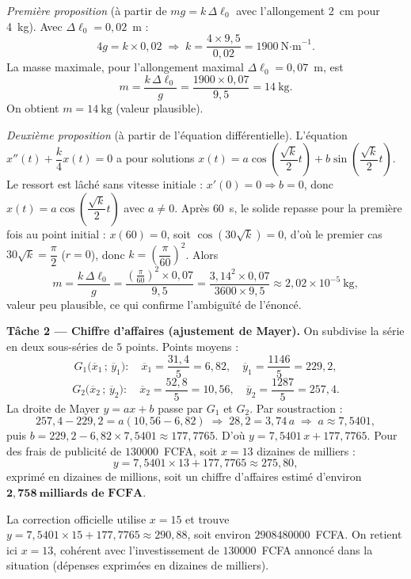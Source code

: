 \emph{Première proposition} (à partir de $mg=k\,\Delta\ell_0$ avec l'allongement
\SI{2}{\centi\metre} pour \SI{4}{\kilo\gram}). Avec $\Delta\ell_0=0{,}02$~m :
\[
4g=k\times0{,}02\;\Longrightarrow\;k=\frac{4\times9{,}5}{0{,}02}=1900\ \text{N·m}^{-1}.
\]
La masse maximale, pour l'allongement maximal $\Delta\ell_0=0{,}07$~m, est
\[
m=\frac{k\,\Delta\ell_0}{g}=\frac{1900\times0{,}07}{9{,}5}=14\ \text{kg}.
\]
On obtient $m=\SI{14}{\kilo\gram}$ (valeur plausible).

\emph{Deuxième proposition} (à partir de l'équation différentielle). L'équation
$x''(t)+\dfrac k4 x(t)=0$ a pour solutions $x(t)=a\cos\!\left(\dfrac{\sqrt k}{2}t\right)+b\sin\!\left(\dfrac{\sqrt k}{2}t\right)$. Le ressort est lâché sans vitesse initiale : $x'(0)=0\Rightarrow b=0$,
donc $x(t)=a\cos\!\left(\dfrac{\sqrt k}{2}t\right)$ avec $a\ne0$. Après $60$~s, le solide repasse pour
la première fois au point initial : $x(60)=0$, soit $\cos\!\left(30\sqrt k\right)=0$, d'où le premier
cas $30\sqrt k=\dfrac\pi2$ ($r=0$), donc $k=\left(\dfrac\pi{60}\right)^2$. Alors
\[
m=\frac{k\,\Delta\ell_0}{g}=\frac{\left(\frac{\pi}{60}\right)^2\times0{,}07}{9{,}5}=\frac{3{,}14^2\times0{,}07}{3600\times9{,}5}\approx2{,}02\times10^{-5}\ \text{kg},
\]
valeur peu plausible, ce qui confirme l'ambiguïté de l'énoncé.

\smallskip
\noindent\textbf{Tâche 2 — Chiffre d'affaires (ajustement de Mayer).}
On subdivise la série en deux sous-séries de $5$ points. Points moyens :
\[
G_1\bigl(\overline x_1\,;\,\overline y_1\bigr):\quad\overline x_1=\frac{31{,}4}{5}=6{,}82,\quad\overline y_1=\frac{1146}{5}=229{,}2,
\]
\[
G_2\bigl(\overline x_2\,;\,\overline y_2\bigr):\quad\overline x_2=\frac{52{,}8}{5}=10{,}56,\quad\overline y_2=\frac{1287}{5}=257{,}4.
\]
La droite de Mayer $y=ax+b$ passe par $G_1$ et $G_2$. Par soustraction :
\[
257{,}4-229{,}2=a(10{,}56-6{,}82)\;\Longrightarrow\;28{,}2=3{,}74\,a\;\Longrightarrow\;a\approx7{,}5401,
\]
puis $b=229{,}2-6{,}82\times7{,}5401\approx177{,}7765$. D'où $y=7{,}5401\,x+177{,}7765$.
Pour des frais de publicité de $\num{130000}$~FCFA, soit $x=13$ dizaines de milliers :
\[
y=7{,}5401\times13+177{,}7765\approx275{,}80,
\]
exprimé en dizaines de millions, soit un chiffre d'affaires estimé d'environ
$\mathbf{2{,}758\ \text{milliards de FCFA}}$.

\begin{remarque}
La correction officielle utilise $x=15$ et trouve $y=7{,}5401\times15+177{,}7765\approx290{,}88$,
soit environ $\num{2908480000}$~FCFA. On retient ici $x=13$, cohérent avec l'investissement de
$\num{130000}$~FCFA annoncé dans la situation (dépenses exprimées en dizaines de milliers).
\end{remarque}

